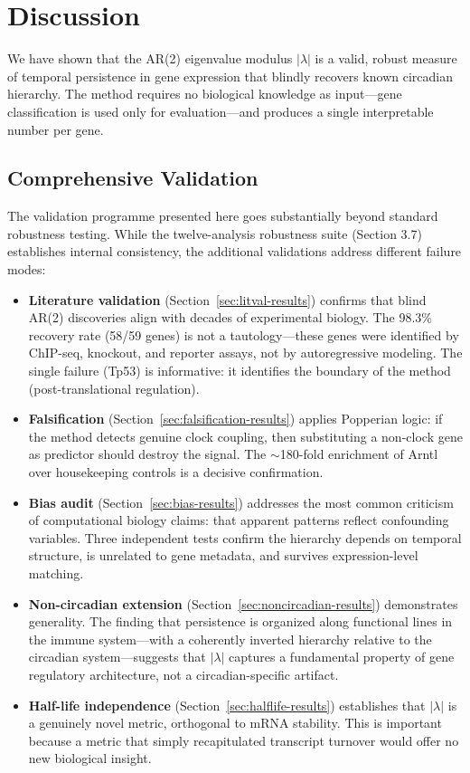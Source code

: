 \documentclass[11pt,letterpaper]{article}
\begin{document}
\section{Discussion}

We have shown that the AR(2) eigenvalue modulus $|\lambda|$ is a valid, robust measure of temporal persistence in gene expression that blindly recovers known circadian hierarchy. The method requires no biological knowledge as input---gene classification is used only for evaluation---and produces a single interpretable number per gene.

\subsection{Comprehensive Validation}

The validation programme presented here goes substantially beyond standard robustness testing. While the twelve-analysis robustness suite (Section 3.7) establishes internal consistency, the additional validations address different failure modes:

\begin{itemize}
\item \textbf{Literature validation} (Section~\ref{sec:litval-results}) confirms that blind AR(2) discoveries align with decades of experimental biology. The 98.3\% recovery rate (58/59 genes) is not a tautology---these genes were identified by ChIP-seq, knockout, and reporter assays, not by autoregressive modeling. The single failure (Tp53) is informative: it identifies the boundary of the method (post-translational regulation).

\item \textbf{Falsification} (Section~\ref{sec:falsification-results}) applies Popperian logic: if the method detects genuine clock coupling, then substituting a non-clock gene as predictor should destroy the signal. The $\sim$180-fold enrichment of Arntl over housekeeping controls is a decisive confirmation.

\item \textbf{Bias audit} (Section~\ref{sec:bias-results}) addresses the most common criticism of computational biology claims: that apparent patterns reflect confounding variables. Three independent tests confirm the hierarchy depends on temporal structure, is unrelated to gene metadata, and survives expression-level matching.

\item \textbf{Non-circadian extension} (Section~\ref{sec:noncircadian-results}) demonstrates generality. The finding that persistence is organized along functional lines in the immune system---with a coherently inverted hierarchy relative to the circadian system---suggests that $|\lambda|$ captures a fundamental property of gene regulatory architecture, not a circadian-specific artifact.

\item \textbf{Half-life independence} (Section~\ref{sec:halflife-results}) establishes that $|\lambda|$ is a genuinely novel metric, orthogonal to mRNA stability. This is important because a metric that simply recapitulated transcript turnover would offer no new biological insight.
\end{itemize}
\end{document}
